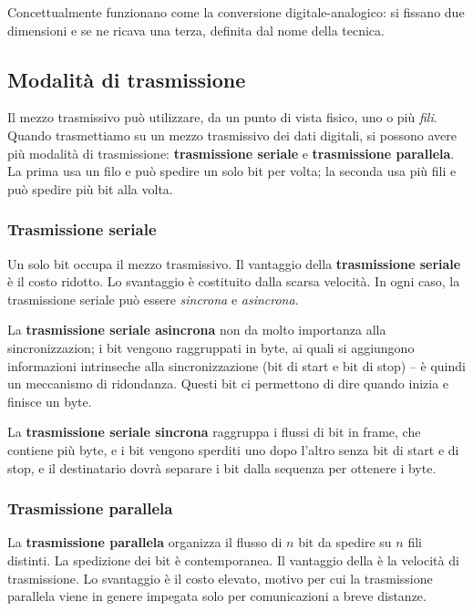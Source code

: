         Concettualmente funzionano come la conversione digitale-analogico: si fissano due dimensioni e se ne ricava una terza, definita dal nome della tecnica.
        
    \subsection{Modalità di trasmissione}
                
        Il mezzo trasmissivo può utilizzare, da un punto di vista fisico, uno o più \textit{fili}. Quando trasmettiamo su un mezzo trasmissivo dei dati digitali, si possono avere più modalità di trasmissione: \textbf{trasmissione seriale} e \textbf{trasmissione parallela}. La prima usa un filo e può spedire un solo bit per volta; la seconda usa più fili e può spedire più bit alla volta.
            
        \subsubsection{Trasmissione seriale}
            
            Un solo bit occupa il mezzo trasmissivo. Il vantaggio della \textbf{trasmissione seriale} è il costo ridotto. Lo svantaggio è costituito dalla scarsa velocità. In ogni caso, la trasmissione seriale può essere \textit{sincrona} e \textit{asincrona}. 
                
            \vspace{3mm}
                
            La \textbf{trasmissione seriale asincrona} non da molto importanza alla sincronizzazion; i bit vengono raggruppati in byte, ai quali si aggiungono informazioni intrinseche alla sincronizzazione (bit di start e bit di stop) -- è quindi un meccanismo di ridondanza. Questi bit ci permettono di dire quando inizia e finisce un byte. 
                
            \vspace{3mm}
                
            La \textbf{trasmissione seriale sincrona} raggruppa i flussi di bit in frame, che contiene più byte, e i bit vengono sperditi uno dopo l'altro senza bit di start e di stop, e il destinatario dovrà separare i bit dalla sequenza per ottenere i byte.
            
        \subsubsection{Trasmissione parallela}
            
            La \textbf{trasmissione parallela} organizza il flusso di $n$ bit da spedire su $n$ fili distinti. La spedizione dei bit è contemporanea. Il vantaggio della è la velocità di trasmissione. Lo svantaggio è il costo elevato, motivo per cui la trasmissione parallela viene in genere impegata solo per comunicazioni a breve distanze.